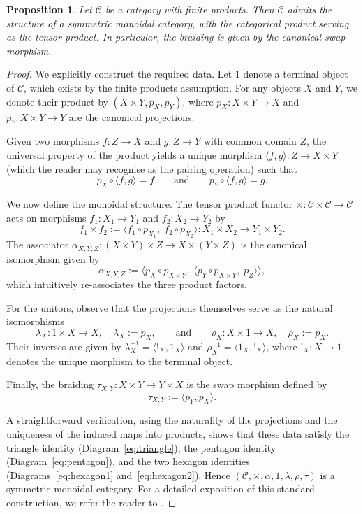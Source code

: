 \documentclass{amsart}
\newtheorem{proposition}{Proposition}[section]
\begin{document}
\begin{proposition}\label{prop:cartesian_monoidal}
Let $\mathcal{C}$ be a category with finite products. Then $\mathcal{C}$ admits the structure of a symmetric monoidal category, with the categorical product serving as the tensor product. In particular, the braiding is given by the canonical swap morphism.
\end{proposition}

\begin{proof}
We explicitly construct the required data. Let $1$ denote a terminal object of $\mathcal{C}$, which exists by the finite products assumption. For any objects $X$ and $Y$, we denote their product by $(X\times Y, p_X, p_Y)$, where $p_X \colon X\times Y \to X$ and $p_Y \colon X\times Y \to Y$ are the canonical projections.

Given two morphisms $f \colon Z \to X$ and $g \colon Z \to Y$ with common domain $Z$, the universal property of the product yields a unique morphism $\langle f, g \rangle \colon Z \to X\times Y$ (which the reader may recognise as the pairing operation) such that
\[
p_X \circ \langle f, g \rangle = f \qquad\text{and}\qquad p_Y \circ \langle f, g \rangle = g.
\]

We now define the monoidal structure. The tensor product functor $\times \colon \mathcal{C}\times\mathcal{C} \to \mathcal{C}$ acts on morphisms $f_1 \colon X_1 \to Y_1$ and $f_2 \colon X_2 \to Y_2$ by
\[
f_1 \times f_2 := \langle f_1 \circ p_{X_1},\; f_2 \circ p_{X_2} \rangle \colon X_1\times X_2 \longrightarrow Y_1\times Y_2.
\]
The associator $\alpha_{X,Y,Z} \colon (X\times Y)\times Z \to X\times(Y\times Z)$ is the canonical isomorphism given by
\[
\alpha_{X,Y,Z} := \big\langle p_X \circ p_{X\times Y},\; \langle p_Y \circ p_{X\times Y},\; p_Z \rangle \big\rangle,
\]
which intuitively re-associates the three product factors.

For the unitors, observe that the projections themselves serve as the natural isomorphisms
\[
\lambda_X \colon 1\times X \longrightarrow X, \quad \lambda_X := p_X,
\qquad\text{and}\qquad
\rho_X \colon X\times 1 \longrightarrow X, \quad \rho_X := p_X.
\]
Their inverses are given by $\lambda_X^{-1} = \langle !_X, 1_X \rangle$ and $\rho_X^{-1} = \langle 1_X, !_X \rangle$, where $!_X \colon X \to 1$ denotes the unique morphism to the terminal object.

Finally, the braiding $\tau_{X,Y} \colon X\times Y \to Y\times X$ is the swap morphism defined by
\[
\tau_{X,Y} := \langle p_Y, p_X \rangle.
\]

A straightforward verification, using the naturality of the projections and the uniqueness of the induced maps into products, shows that these data satisfy the triangle identity (Diagram~\ref{eq:triangle}), the pentagon identity (Diagram~\ref{eq:pentagon}), and the two hexagon identities (Diagrams~\ref{eq:hexagon1} and~\ref{eq:hexagon2}). Hence $(\mathcal{C},\times,\alpha,1,\lambda,\rho,\tau)$ is a symmetric monoidal category. For a detailed exposition of this standard construction, we refer the reader to \cite[Chapter~2]{borceux1994handbook}.
\end{proof}
\end{document}
